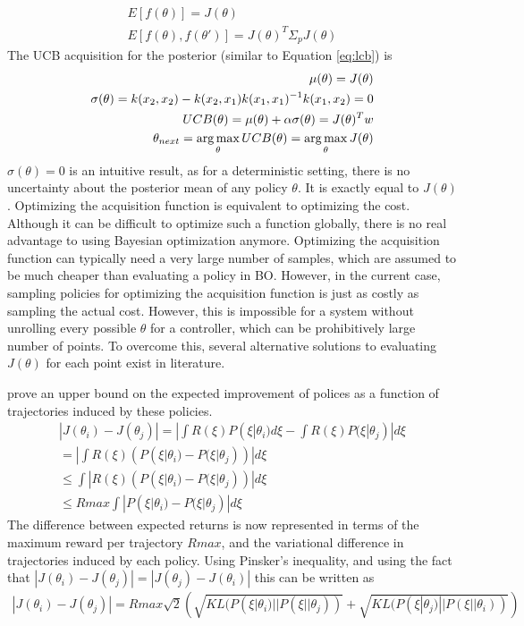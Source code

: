 \begin{align}
    E[f(\theta)] = J(\theta)\\
    E[f(\theta),f(\theta')] = J(\theta)^T \Sigma_p J(\theta)
\end{align}
The UCB acquisition for the posterior (similar to Equation \ref{eq:lcb}) is
\begin{align*}
    \mu(\theta) = J(\theta)\\
    \sigma(\theta) = k(x_2,x_2)-k(x_2,x_1)k(x_1,x_1)^{-1} k(x_1,x_2) = 0 \\
    UCB(\theta) = \mu(\theta) + \alpha \sigma(\theta) = J(\theta)^Tw \\
    \theta_{next} = \operatorname*{arg\,max}_{\theta} UCB(\theta) = \operatorname*{arg\,max}_{\theta} J(\theta)
\end{align*}
$\sigma(\theta) = 0$ is an intuitive result, as for a deterministic setting, there is no uncertainty about the posterior mean of any policy $\theta$. It is exactly equal to $J(\theta)$. Optimizing the acquisition function is equivalent to optimizing the cost. Although it can be difficult to optimize such a function globally, there is no real advantage to using Bayesian optimization anymore. Optimizing the acquisition function can typically need a very large number of samples, which are assumed to be much cheaper than evaluating a policy in BO. However, in the current case, sampling policies for optimizing the acquisition function is just as costly as sampling the actual cost. 
However, this is impossible for a system without unrolling every possible $\theta$ for a controller, which can be prohibitively large number of points. To overcome this, several alternative solutions to evaluating $J(\theta)$ for each point exist in literature.

\cite{wilson2014using} prove an upper bound on the expected improvement of polices as a function of trajectories induced by these policies. 
\begin{align}
    |J(\theta_i) - J(\theta_j)| = |\int R(\xi)P(\xi | \theta_i) d\xi - \int R(\xi)P(\xi | \theta_j)| d\xi \\
     = |\int R(\xi) (P(\xi | \theta_i) - P(\xi | \theta_j))| d\xi \\
     \leq  \int | R(\xi) (P(\xi | \theta_i) - P(\xi | \theta_j))| d\xi \\
     \leq  Rmax \int | P(\xi | \theta_i) - P(\xi | \theta_j)| d\xi
\end{align}
The difference between expected returns is now represented in terms of the maximum reward per trajectory $Rmax$, and the variational difference in trajectories induced by each policy. Using Pinsker's inequality, and using the fact that $|J(\theta_i) - J(\theta_j)| = |J(\theta_j) - J(\theta_i)|$  this can be written as
\begin{align}
    |J(\theta_i) - J(\theta_j)| = Rmax \sqrt{2} (\sqrt{KL(P(\xi|\theta_i)||P(\xi || \theta_j))} + \sqrt{KL(P(\xi|\theta_j)||P(\xi || \theta_i))} )
\end{align}

